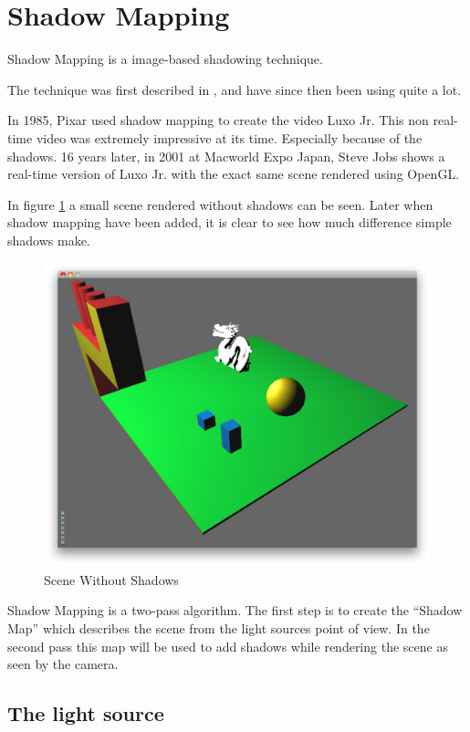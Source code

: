 
\section{Shadow Mapping}

Shadow Mapping is a image-based shadowing technique.

The technique was first described in \citep{lance78}, and have since
then been using quite a lot.

In 1985, Pixar used shadow mapping to create the video Luxo Jr. This
non real-time video was extremely impressive at its time. Especially
because of the shadows. 16 years later, in 2001 at Macworld Expo
Japan, Steve Jobs shows a real-time version of Luxo Jr. with the
exact same scene rendered using OpenGL.

In figure \ref{fig:scene} a small scene rendered without shadows can
be seen. Later when shadow mapping have been added, it is clear to see
how much difference simple shadows make.

\begin{figure}[h]
  \centering
  \includegraphics[width=\textwidth]{gfx/scenenoshadow}  
  \caption{Scene Without Shadows}
  \label{fig:scene}
\end{figure}

Shadow Mapping is a two-pass algorithm. The first step is to create
the ``Shadow Map'' which describes the scene from the light sources
point of view. In the second pass this map will be used to add shadows
while rendering the scene as seen by the camera.


\subsection{The light source}

